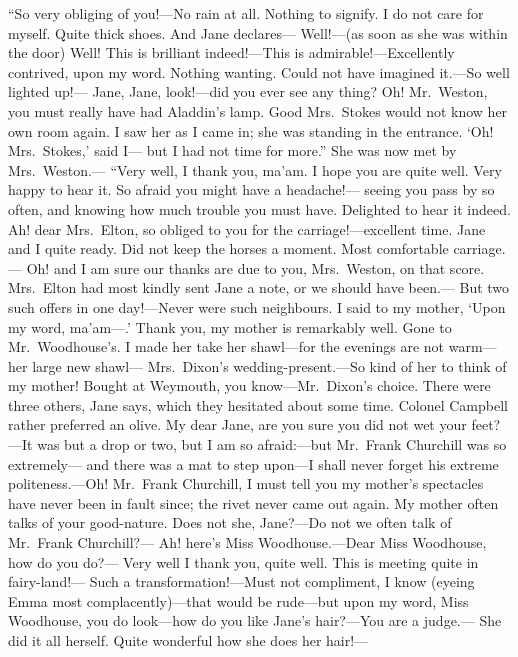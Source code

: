 ``So very obliging of you!---No rain at all.  Nothing to signify.
I do not care for myself.  Quite thick shoes.  And Jane declares---%
Well!---(as soon as she was within the door) Well!  This is brilliant
indeed!---This is admirable!---Excellently contrived, upon my word.
Nothing wanting.  Could not have imagined it.---So well lighted up!---%
Jane, Jane, look!---did you ever see any thing?  Oh!  Mr.\ Weston,
you must really have had Aladdin's lamp.  Good Mrs.\ Stokes
would not know her own room again.  I saw her as I came in;
she was standing in the entrance.  `Oh!  Mrs.\ Stokes,' said I---%
but I had not time for more.''  She was now met by Mrs.\ Weston.---%
``Very well, I thank you, ma'am. I hope you are quite well.
Very happy to hear it.  So afraid you might have a headache!---%
seeing you pass by so often, and knowing how much trouble you must have.
Delighted to hear it indeed.  Ah! dear Mrs.\ Elton, so obliged
to you for the carriage!---excellent time.  Jane and I quite ready.
Did not keep the horses a moment.  Most comfortable carriage.---%
Oh! and I am sure our thanks are due to you, Mrs.\ Weston, on that score.
Mrs.\ Elton had most kindly sent Jane a note, or we should have been.---%
But two such offers in one day!---Never were such neighbours.
I said to my mother, `Upon my word, ma'am---.'  Thank you, my mother
is remarkably well.  Gone to Mr.\ Woodhouse's. I made her take
her shawl---for the evenings are not warm---her large new shawl---%
Mrs.\ Dixon's wedding-present.---So kind of her to think of my mother!
Bought at Weymouth, you know---Mr.\ Dixon's choice.  There were
three others, Jane says, which they hesitated about some time.
Colonel Campbell rather preferred an olive.  My dear Jane,
are you sure you did not wet your feet?---It was but a drop or two,
but I am so afraid:---but Mr.\ Frank Churchill was so extremely---%
and there was a mat to step upon---I shall never forget his
extreme politeness.---Oh!  Mr.\ Frank Churchill, I must tell you
my mother's spectacles have never been in fault since; the rivet
never came out again.  My mother often talks of your good-nature.
Does not she, Jane?---Do not we often talk of Mr.\ Frank Churchill?---%
Ah! here's Miss Woodhouse.---Dear Miss Woodhouse, how do you do?---%
Very well I thank you, quite well.  This is meeting quite in fairy-land!---%
Such a transformation!---Must not compliment, I know (eyeing Emma
most complacently)---that would be rude---but upon my word, Miss Woodhouse,
you do look---how do you like Jane's hair?---You are a judge.---%
She did it all herself.  Quite wonderful how she does her hair!---%
